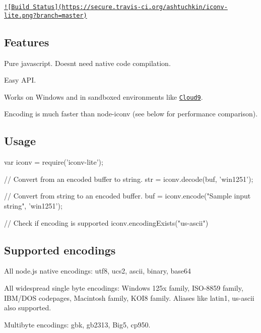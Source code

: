 \href{http://travis-ci.org/ashtuchkin/iconv-lite}{\tt !\mbox{[}Build Status\mbox{]}(https\+://secure.\+travis-\/ci.\+org/ashtuchkin/iconv-\/lite.\+png?branch=master)}

\subsection*{Features}


\begin{DoxyItemize}
\item Pure javascript. Doesn\textquotesingle{}t need native code compilation.
\item Easy A\+P\+I.
\item Works on Windows and in sandboxed environments like \href{http://c9.io}{\tt Cloud9}.
\item Encoding is much faster than node-\/iconv (see below for performance comparison).
\end{DoxyItemize}

\subsection*{Usage}

\begin{DoxyVerb}var iconv = require('iconv-lite');

// Convert from an encoded buffer to string.
str = iconv.decode(buf, 'win1251');

// Convert from string to an encoded buffer.
buf = iconv.encode("Sample input string", 'win1251');

// Check if encoding is supported
iconv.encodingExists("us-ascii")
\end{DoxyVerb}


\subsection*{Supported encodings}


\begin{DoxyItemize}
\item All node.\+js native encodings\+: \textquotesingle{}utf8\textquotesingle{}, \textquotesingle{}ucs2\textquotesingle{}, \textquotesingle{}ascii\textquotesingle{}, \textquotesingle{}binary\textquotesingle{}, \textquotesingle{}base64\textquotesingle{}
\item All widespread single byte encodings\+: Windows 125x family, I\+S\+O-\/8859 family, I\+B\+M/\+D\+O\+S codepages, Macintosh family, K\+O\+I8 family. Aliases like \textquotesingle{}latin1\textquotesingle{}, \textquotesingle{}us-\/ascii\textquotesingle{} also supported.
\item Multibyte encodings\+: \textquotesingle{}gbk\textquotesingle{}, \textquotesingle{}gb2313\textquotesingle{}, \textquotesingle{}Big5\textquotesingle{}, \textquotesingle{}cp950\textquotesingle{}.
\end{DoxyItemize}

